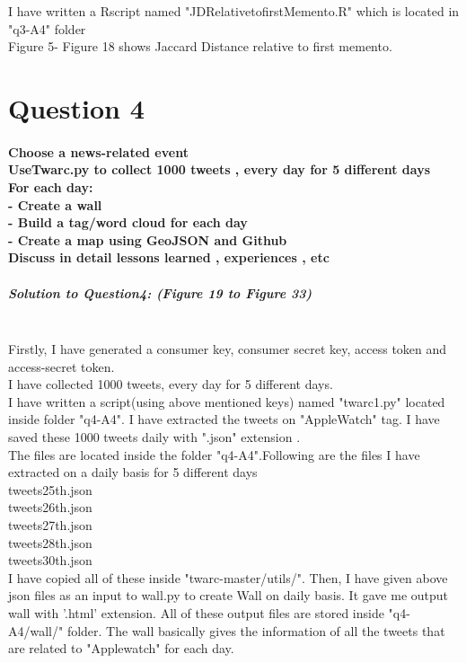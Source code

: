 \documentclass[12pt]{Report}
\begin{document}
I have written a Rscript named "JDRelativetofirstMemento.R" which is located in "q3-A4" folder \\

Figure 5- Figure 18 shows Jaccard Distance relative to first memento.



\section{Question 4\\}

\paragraph{Choose a news-related event\\ UseTwarc.py to collect 1000 tweets , every day for 5 different days \\For each day:\\ - Create a wall \\ - Build a tag/word cloud for each day \\ - Create a map using GeoJSON and Github\\ Discuss in detail lessons learned , experiences , etc\\}

\subparagraph{Solution to Question4: (Figure 19 to Figure 33) \\\\}
Firstly, I have generated a consumer key, consumer secret key, access token and access-secret token.\\
 I have collected 1000 tweets, every day for 5 different days.\\
I have written a script(using above mentioned keys)  named "twarc1.py" located inside folder "q4-A4". I have extracted the tweets on "AppleWatch" tag. I have saved these 1000 tweets daily with ".json" extension .\\
The files are located inside the folder "q4-A4".Following are the files I have extracted on a daily basis for 5 different days\\ 

tweets25th.json \\
  tweets26th.json \\
  tweets27th.json \\
  tweets28th.json \\
  tweets30th.json \\

I have copied all of these inside "twarc-master/utils/".
Then, I have given above json files as an input to wall.py to create Wall on daily basis. It gave me output wall with '.html' extension. All of these output files are stored inside "q4-A4/wall/" folder. The wall basically gives the information of all the tweets that are related to "Applewatch" for each day. 
\end{document}
